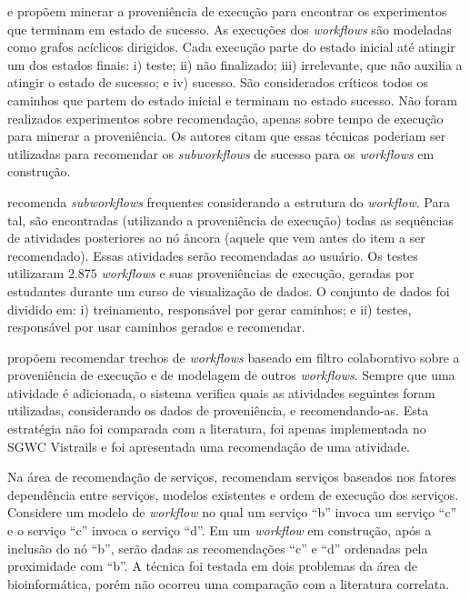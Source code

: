  e  propõem minerar a proveniência de execução para encontrar os experimentos que terminam em estado de sucesso. As execuções dos \emph{workflows} são modeladas como grafos acíclicos dirigidos. Cada execução parte do estado inicial até atingir um dos estados finais: i) teste; ii) não finalizado; iii) irrelevante, que não auxilia a atingir o estado de sucesso; e iv) sucesso. São considerados críticos todos os caminhos que partem do estado inicial e terminam no estado sucesso. Não foram realizados experimentos sobre recomendação, apenas sobre tempo de execução para minerar a proveniência. Os autores citam que essas técnicas poderiam ser utilizadas para recomendar os \emph{subworkflows} de sucesso para os \emph{workflows} em construção.

 recomenda \emph{subworkflows} frequentes considerando a estrutura do \emph{workflow}. Para tal, são encontradas (utilizando a proveniência de execução) todas as sequências de atividades posteriores ao nó âncora (aquele que vem antes do item a ser recomendado). Essas atividades serão recomendadas ao usuário. Os testes utilizaram \(2.875\) \emph{workflows} e suas proveniências de execução, geradas por estudantes durante um curso de visualização de dados. O conjunto de dados foi dividido em: i) treinamento, responsável por gerar caminhos; e ii) testes, responsável por usar caminhos gerados e recomendar.

 propõem recomendar trechos de \emph{workflows} baseado em filtro colaborativo sobre a proveniência de execução e de modelagem de outros \emph{workflows}. Sempre que uma atividade é adicionada, o sistema verifica quais as atividades seguintes foram utilizadas, considerando os dados de proveniência, e recomendando-as. Esta estratégia não foi comparada com a literatura, foi apenas implementada no SGWC Vistrails \cite{Vistrails} e foi apresentada uma recomendação de uma atividade.

Na área de recomendação de serviços,  recomendam serviços baseados nos fatores dependência entre serviços, modelos existentes e ordem de execução dos serviços. Considere um modelo de \emph{workflow} no qual um serviço ``b'' invoca um serviço ``c'' e o serviço ``c'' invoca o serviço ``d''. Em um \emph{workflow} em construção, após a inclusão do nó ``b'', serão dadas as recomendações ``c'' e ``d'' ordenadas pela proximidade com ``b''. A técnica foi testada em dois problemas da área de bioinformática, porém não ocorreu uma comparação com a literatura correlata.

